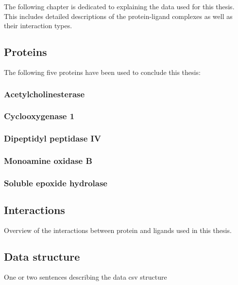 The following chapter is dedicated to explaining the data used for this thesis.
This includes detailed descriptions of the protein-ligand complexes as well as their interaction types.

\subsection{Proteins}
The following five proteins have been used to conclude this thesis:
\subsubsection*{Acetylcholinesterase}
\subsubsection*{Cyclooxygenase 1}
\subsubsection*{Dipeptidyl peptidase IV}
\subsubsection*{Monoamine oxidase B}
\subsubsection*{Soluble epoxide hydrolase}
\subsection{Interactions}
Overview of the interactions between protein and ligands used in this thesis.
\subsection{Data structure}
One or two sentences describing the data csv structure